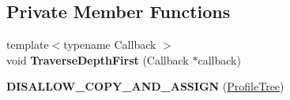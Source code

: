 \subsection*{Private Member Functions}
\begin{DoxyCompactItemize}
\item 
{\footnotesize template$<$typename Callback $>$ }\\void {\bfseries Traverse\+Depth\+First} (Callback $\ast$callback)\hypertarget{classv8_1_1internal_1_1_profile_tree_aa402b7a7fbb047cd1600e90e2a5fbec3}{}\label{classv8_1_1internal_1_1_profile_tree_aa402b7a7fbb047cd1600e90e2a5fbec3}

\item 
{\bfseries D\+I\+S\+A\+L\+L\+O\+W\+\_\+\+C\+O\+P\+Y\+\_\+\+A\+N\+D\+\_\+\+A\+S\+S\+I\+GN} (\hyperlink{classv8_1_1internal_1_1_profile_tree}{Profile\+Tree})\hypertarget{classv8_1_1internal_1_1_profile_tree_aacf2030037a5ac22ba6914348a3e5918}{}\label{classv8_1_1internal_1_1_profile_tree_aacf2030037a5ac22ba6914348a3e5918}

\end{DoxyCompactItemize}
